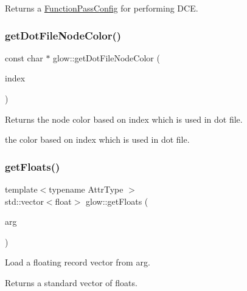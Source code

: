\begin{DoxyReturn}{Returns}
a \hyperlink{classglow_1_1_function_pass_config}{Function\+Pass\+Config} for performing D\+CE. 
\end{DoxyReturn}
\mbox{\label{namespaceglow_abdedf715e997af0b1a4ad4b1882bed49}} 
\subsubsection{\texorpdfstring{get\+Dot\+File\+Node\+Color()}{getDotFileNodeColor()}}
{\footnotesize\ttfamily const char $\ast$ glow\+::get\+Dot\+File\+Node\+Color (\begin{DoxyParamCaption}\item[{size\+\_\+t}]{index }\end{DoxyParamCaption})}

\begin{DoxyReturn}{Returns}
the node color based on {\ttfamily index} which is used in dot file.

the color based on {\ttfamily index} which is used in dot file. 
\end{DoxyReturn}
\mbox{\label{namespaceglow_ad9cf5d13b978aa755ff9b01edad65466}} 
\subsubsection{\texorpdfstring{get\+Floats()}{getFloats()}}
{\footnotesize\ttfamily template$<$typename Attr\+Type $>$ \\
std\+::vector$<$float$>$ glow\+::get\+Floats (\begin{DoxyParamCaption}\item[{const Attr\+Type $\ast$}]{arg }\end{DoxyParamCaption})}

Load a floating record vector from {\ttfamily arg}. \begin{DoxyReturn}{Returns}
a standard vector of floats. 
\end{DoxyReturn}
\mbox{\label{namespaceglow_a589ee9d58bb8726a5e764b1dd74f8070}} 
